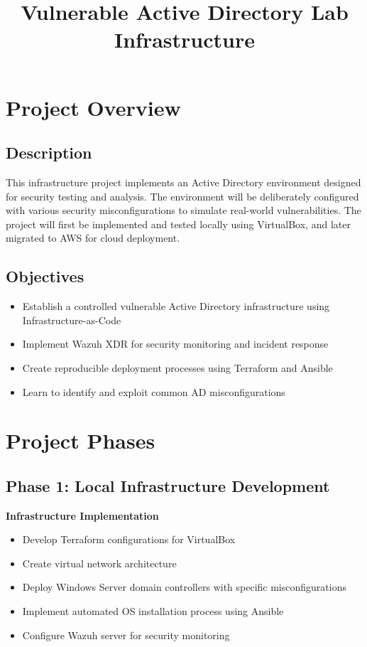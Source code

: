 \documentclass[11pt,a4paper]{article}
\title{\textbf{Vulnerable Active Directory Lab Infrastructure}}
\begin{document}
\maketitle

\section{Project Overview}
\subsection{Description}
This infrastructure project implements an Active Directory environment designed for security testing and analysis. The environment will be deliberately configured with various security misconfigurations to simulate real-world vulnerabilities. The project will first be implemented and tested locally using VirtualBox, and later migrated to AWS for cloud deployment.

\subsection{Objectives}
\begin{itemize}
    \item Establish a controlled vulnerable Active Directory infrastructure using Infrastructure-as-Code
    \item Implement Wazuh XDR for security monitoring and incident response
    \item Create reproducible deployment processes using Terraform and Ansible
    \item Learn to identify and exploit common AD misconfigurations
\end{itemize}

\section{Project Phases}

\subsection{Phase 1: Local Infrastructure Development}
\textbf{Infrastructure Implementation}
\begin{itemize}
    \item Develop Terraform configurations for VirtualBox
    \item Create virtual network architecture
    \item Deploy Windows Server domain controllers with specific misconfigurations
    \item Implement automated OS installation process using Ansible
    \item Configure Wazuh server for security monitoring
\end{itemize}
\end{document}
